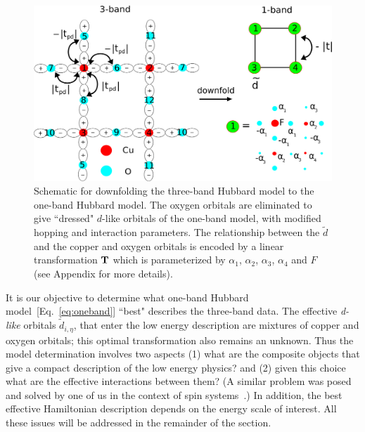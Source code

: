 \begin{figure}
\centering
\includegraphics[width=0.9\linewidth]{./Figures/three_band_figure.eps}
\caption
{Schematic for downfolding the three-band Hubbard model to the one-band Hubbard model. The oxygen orbitals are 
eliminated to give ``dressed" $d$-like orbitals of the one-band model, with modified hopping and interaction parameters. 
The relationship between the $\tilde{d}$ and the copper and oxygen orbitals is encoded by a linear transformation 
${\bf T}$ which is parameterized by $\alpha_1$, $\alpha_2$, $\alpha_3$, $\alpha_4$ and $F$ (see Appendix for more details).}
\label{fig:threeband} 
\end{figure}

It is our objective to determine what one-band Hubbard model~[Eq.~\eqref{eq:oneband}]
``best" describes the three-band data. The effective \textit{d-like} orbitals $\tilde{d}_{i,\eta}$, 
that enter the low energy description are mixtures of copper and oxygen orbitals; this optimal transformation also remains an unknown. 
Thus the model determination involves two aspects (1) what are the composite objects that give a 
compact description of the low energy physics? and (2) given this choice what are the effective interactions between them? 
(A similar problem was posed and solved by one of us in the context of spin systems~\cite{Changlani_percolation}.)
In addition, the best effective Hamiltonian description depends on the energy scale of interest. 
All these issues will be addressed in the remainder of the section. 

